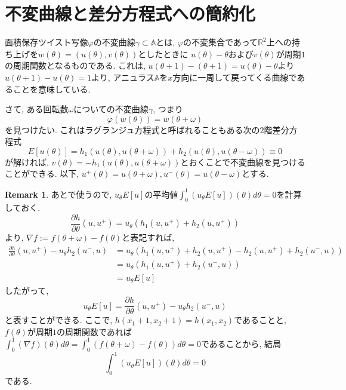 \documentclass[a4paper]{ujarticle}
\numberwithin{equation}{section}
\theoremstyle{definition}
\newtheorem{remark}{Remark}
\begin{document}
    \section{不変曲線と差分方程式への簡約化}
        面積保存ツイスト写像$\varphi$の不変曲線$\gamma \subset \mathbb{A}$とは, 
        $\varphi$の不変集合であって$\mathbb{R}^2$上への持ち上げを$w(\theta) = (u(\theta), v(\theta))$としたときに
        $u(\theta) - \theta$および$v(\theta)$が周期$1$の周期関数となるものである.
        これは, $u(\theta + 1) - (\theta + 1) = u(\theta) - \theta$より$u(\theta + 1) - u(\theta) = 1$より, 
        アニュラス$\mathbb{A}$を$x$方向に一周して戻ってくる曲線であることを意味している.
        
        さて, ある回転数$\omega$についての不変曲線$\gamma$, つまり
        \[
                \varphi(w(\theta)) = w(\theta + \omega)
        \]
        を見つけたい. これはラグランジュ方程式と呼ばれることもある次の$2$階差分方程式
        \begin{equation} \label{eq:3}
            E[u(\theta)] = h_1(u(\theta), u(\theta + \omega)) + h_2(u(\theta), u(\theta - \omega)) \equiv 0
        \end{equation}
        が解ければ, $v(\theta) = - h_1(u(\theta), u(\theta + \omega))$とおくことで不変曲線を見つけることができる.
        以下, $u^{+}(\theta) = u(\theta + \omega), u^{-}(\theta) = u(\theta - \omega)$とする.

        \begin{remark}
            あとで使うので, $u_{\theta} E[u]$の平均値$\displaystyle \int^{1}_{0} (u_{\theta} E[u])(\theta) d \theta = 0$を計算しておく.
            \[
                \frac{\partial h}{\partial \theta}(u, u^{+}) = u_{\theta} (h_1(u, u^{+}) + h_2(u, u^{+}))
            \]
            より, $\nabla f := f(\theta + \omega) - f(\theta)$と表記すれば,
            \begin{align}
                \frac{\partial h}{\partial \theta}(u, u^{+}) - u_{\theta} h_2(u^{-}, u)
                &= u_{\theta} (h_1(u, u^{+}) + h_2(u, u^{+}) - h_2(u, u^{+}) + h_2(u^{-}, u)) \\
                &= u_{\theta} (h_1(u, u^{+}) + h_2(u^{-}, u)) \\
                &= u_{\theta} E[u]
            \end{align}
            したがって, 
            \[
                u_{\theta} E[u] = \frac{\partial h}{\partial \theta}(u, u^{+}) - u_{\theta} h_2(u^{-}, u)
            \]
            と表すことができる.
            ここで, $h(x_1+1, x_2 + 1) = h(x_1, x_2)$であることと, 
            $f(\theta)$が周期$1$の周期関数であれば$\displaystyle \int^{1}_{0} (\nabla f)(\theta) d \theta = \int^{1}_{0} (f(\theta + \omega) - f(\theta)) d \theta = 0$であることから,
            結局
            \[
                \int^{1}_{0} (u_{\theta} E[u])(\theta) d \theta = 0
            \]
            である.

        \end{remark}
\end{document}
